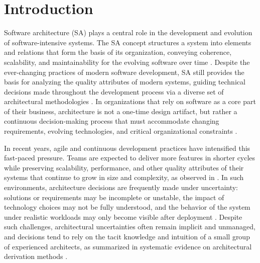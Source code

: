 
\chapter{Introduction}
\label{ch:intro}
\label{chap:introduction}

Software architecture (SA) plays a central role in the development and evolution
of software-intensive systems. The SA concept structures a system into elements and relations that form the basis of
its organization, conveying coherence, scalability, and maintainability for the
evolving software over time \citep{perryWolf1992}. Despite the ever-changing practices of modern
software development, SA still provides the basis for analyzing the quality
attributes of modern systems, guiding technical decisions made throughout
the development process via a diverse set of architectural methodologies \citep{souza2019}. In organizations that rely on
software as a core part of their business, architecture is not a one-time design
artifact, but rather a continuous decision-making process that must accommodate changing
requirements, evolving technologies, and critical organizational constraints
\citep{silva2024tse}.

In recent years, agile and continuous development practices have intensified this fast-paced pressure. 
Teams are expected to deliver more features in shorter cycles while preserving scalability, performance, and other quality attributes of their systems that continue to grow in size and complexity, as observed in \citet{silva2024tse,silva2024ieeesw}. 
In such environments, architecture decisions are frequently made under uncertainty: solutions or requirements may be incomplete or unstable, the impact of technology choices may not be fully understood, and the behavior of the system under realistic workloads may only become visible after deployment \citep{silva2024tse}. 
Despite such challenges, architectural uncertainties often remain implicit and unmanaged, and decisions tend to rely on the tacit knowledge and intuition of a small group of experienced architects, as summarized in systematic evidence on architectural derivation methods \citep{souza2019}.

